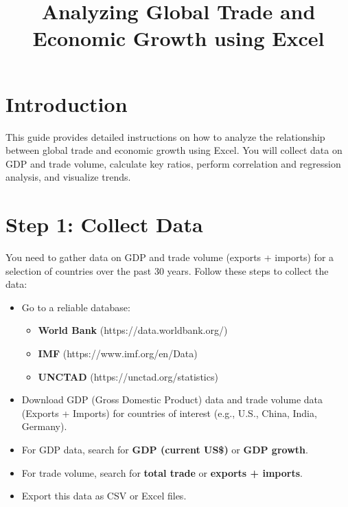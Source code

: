 \documentclass{article}
\title{Analyzing Global Trade and Economic Growth using Excel}
\author{}
\date{}
\begin{document}
\maketitle

\section{Introduction}
This guide provides detailed instructions on how to analyze the relationship between global trade and economic growth using Excel. You will collect data on GDP and trade volume, calculate key ratios, perform correlation and regression analysis, and visualize trends.

\section{Step 1: Collect Data}
You need to gather data on GDP and trade volume (exports + imports) for a selection of countries over the past 30 years. Follow these steps to collect the data:

\begin{itemize}
    \item Go to a reliable database:
    \begin{itemize}
        \item \textbf{World Bank} (https://data.worldbank.org/)
        \item \textbf{IMF} (https://www.imf.org/en/Data)
        \item \textbf{UNCTAD} (https://unctad.org/statistics)
    \end{itemize}
    \item Download GDP (Gross Domestic Product) data and trade volume data (Exports + Imports) for countries of interest (e.g., U.S., China, India, Germany).
    \item For GDP data, search for \textbf{GDP (current US\$)} or \textbf{GDP growth}.
    \item For trade volume, search for \textbf{total trade} or \textbf{exports + imports}.
    \item Export this data as CSV or Excel files.
\end{itemize}
\end{document}

